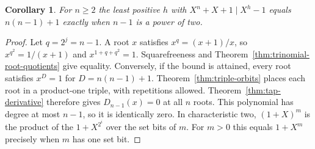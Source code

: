 \documentclass[11pt]{article}
\newtheorem{corollary}[theorem]{Corollary}
\begin{document}
\begin{corollary}\label{cor:sharp-linear-tap}
For \(n\ge2\) the least positive \(h\) with \(X^n+X+1\mid X^h-1\)
equals \(n(n-1)+1\) exactly when \(n-1\) is a power of two.
\end{corollary}
\begin{proof}
Let \(q=2^j=n-1\). A root \(x\) satisfies \(x^q=(x+1)/x\),
so \(x^{q^2}=1/(x+1)\) and \(x^{1+q+q^2}=1\).
Squarefreeness and Theorem~\ref{thm:trinomial-root-quotients} give equality.
Conversely, if the bound is attained, every root satisfies \(x^D=1\)
for \(D=n(n-1)+1\). Theorem~\ref{thm:triple-orbits} places each root in a
product-one triple, with repetitions allowed. Theorem~\ref{thm:tap-derivative}
therefore gives \(D_{n-1}(x)=0\) at all \(n\) roots. This polynomial
has degree at most \(n-1\), so it is identically zero.
In characteristic two, \((1+X)^m\) is the product of the
\(1+X^{2^i}\) over the set bits of \(m\).
For \(m>0\) this equals \(1+X^m\) precisely when \(m\) has one set bit.
\end{proof}
\end{document}
